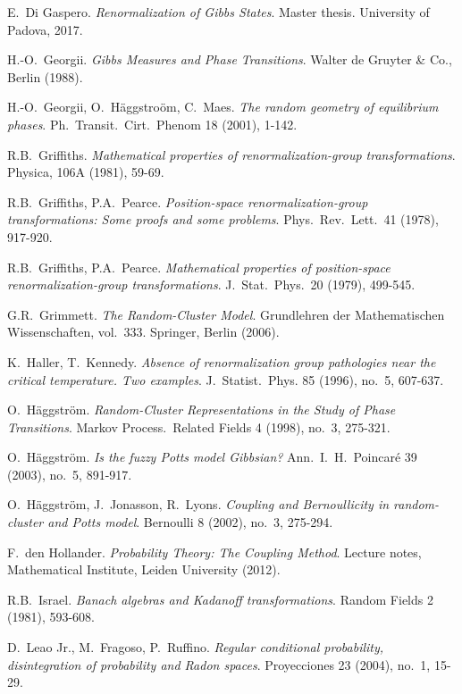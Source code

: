 \documentclass[12pt]{article}
\newcommand{\1}{\mathbbm{1}}
\newcommand{\5}{\vspace{0.5cm}}
\theoremstyle{definition}
\begin{document}
\begin{thebibliography}{++}
 E.~Di Gaspero. \textit{Renormalization of Gibbs States}. Master thesis. University of Padova, 2017.

 H.-O.~Georgii. \textit{Gibbs Measures and Phase Transitions}. Walter de Gruyter \& Co., Berlin (1988).

 H.-O.~Georgii, O.~H\"aggstro\"om, C.~Maes. \textit{The random geometry of equilibrium phases}. Ph.~Transit.~Cirt.~Phenom 18 (2001), 1-142.

 R.B.~Griffiths. \textit{Mathematical properties of renormalization-group transformations}. Physica, 106A (1981), 59-69.

 R.B.~Griffiths, P.A.~Pearce. \textit{Position-space renormalization-group transformations: Some proofs and some problems}. Phys.~Rev.~Lett.~41 (1978), 917-920.

 R.B.~Griffiths, P.A.~Pearce. \textit{Mathematical properties of position-space renormalization-group transformations}. J.~Stat.~Phys.~20 (1979), 499-545.

 G.R.~Grimmett. \textit{The Random-Cluster Model}. Grundlehren der Mathematischen Wissenschaften, vol.~333. Springer, Berlin (2006).

 K.~Haller, T.~Kennedy. \textit{Absence of renormalization group pathologies near the critical temperature. Two examples}. J.~Statist.~Phys. 85 (1996), no.~5, 607-637.

 O.~H\"aggstr\"om. \textit{Random-Cluster Representations in the Study of Phase Transitions}. Markov Process.~Related Fields 4 (1998), no.~3, 275-321.

 O.~H\"aggstr\"om. \textit{Is the fuzzy Potts model Gibbsian?} Ann.~I.~H.~Poincar\'e 39 (2003), no.~5, 891-917.

 O.~H\"aggstr\"om, J.~Jonasson, R.~Lyons. \textit{Coupling and Bernoullicity in random-cluster and Potts model}. Bernoulli 8 (2002), no.~3, 275-294.

 F.~den Hollander. \textit{Probability Theory: The Coupling Method}. Lecture notes, Mathematical Institute, Leiden University (2012).

 R.B.~Israel. \textit{Banach algebras and Kadanoff transformations}. Random Fields 2 (1981), 593-608.

 D.~Leao Jr., M.~Fragoso, P.~Ruffino. \textit{Regular conditional probability, disintegration of probability and Radon spaces}. Proyecciones 23 (2004), no.~1, 15-29.


\end{thebibliography}
\end{document}
